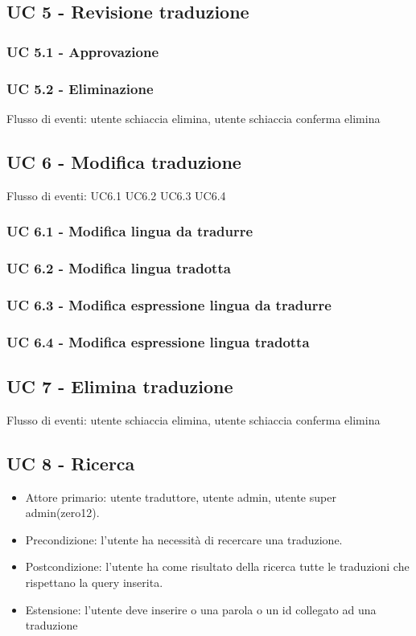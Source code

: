 \subsection{UC 5 - Revisione traduzione}
    \subsubsection{UC 5.1 - Approvazione}
    \subsubsection{UC 5.2 - Eliminazione}
    Flusso di eventi: utente schiaccia elimina, utente schiaccia conferma elimina
\subsection{UC 6 - Modifica traduzione}
Flusso di eventi: UC6.1 UC6.2 UC6.3 UC6.4   %
    \subsubsection{UC 6.1 - Modifica lingua da tradurre}
    \subsubsection{UC 6.2 - Modifica lingua tradotta}
    \subsubsection{UC 6.3 - Modifica espressione lingua da tradurre}
    \subsubsection{UC 6.4 - Modifica espressione lingua tradotta}
\subsection{UC 7 - Elimina traduzione} %
Flusso di eventi: utente schiaccia elimina, utente schiaccia conferma elimina
\subsection{UC 8 - Ricerca}
    \begin{itemize}
        \item Attore primario: utente traduttore, utente admin, utente super admin(zero12).
        \item Precondizione: l'utente ha necessità di recercare una traduzione.
        \item Postcondizione: l'utente ha come risultato della ricerca tutte le traduzioni che rispettano la query inserita.
        \item Estensione: l'utente deve inserire o una parola o un id collegato ad una traduzione
    \end{itemize}
